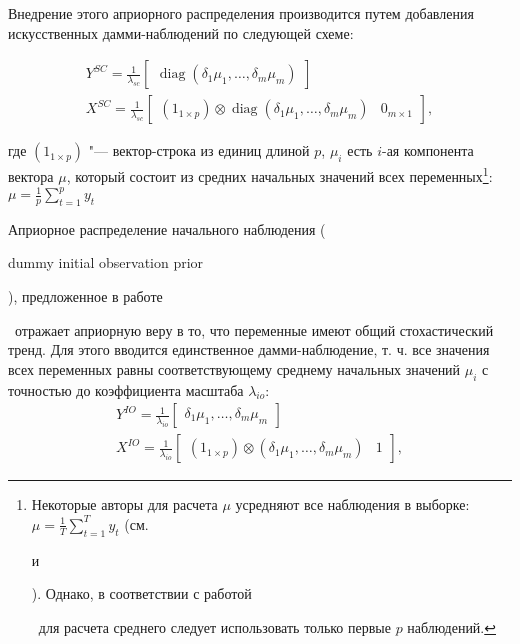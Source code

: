 \documentclass[11pt]{article} %
\DeclareMathOperator{\diag}{diag}
\newcommand{\post}{\overline}
\newcommand{\eng}[1]{\begin{otherlanguage}{english}#1\end{otherlanguage}}
\begin{document}
Внедрение этого априорного распределения производится путем добавления искусственных дамми-наблюдений по следующей схеме:


\begin{gather}
Y^{SC}=\frac{1}{\lambda_{sc}}\begin{bmatrix}\diag(\delta_1\mu_1,\ldots,\delta_m\mu_m)\end{bmatrix}\\
X^{SC}=\frac{1}{\lambda_{sc}}\begin{bmatrix}(1_{1\times p})\otimes \diag(\delta_1\mu_1,\ldots,\delta_m\mu_m) &0_{m\times 1}\end{bmatrix},
\end{gather}

где $(1_{1\times p})$ "--- вектор-строка из единиц длиной $p$, $\mu_i$ есть $i$-ая компонента вектора $\mu$, который состоит из средних начальных значений всех переменных\footnote{Некоторые авторы для  расчета $\mu$ усредняют все наблюдения в выборке: $\mu=\frac{1}{T}\sum_{t=1}^T y_t$ (см. \eng{\cite{banbura_al_2010}} и \eng{\cite{carriero_al_2015}}). Однако, в соответствии с работой \eng{\cite{sims_zha_1998}}~для расчета среднего следует использовать только первые $p$ наблюдений.}: $\mu=\frac{1}{p}\sum_{t=1}^p y_t$

Априорное распределение начального наблюдения (\eng{dummy initial observation prior}), предложенное в работе \eng{\cite{sims_1993}}~отражает априорную веру в то, что переменные имеют общий стохастический тренд. Для этого вводится единственное дамми-наблюдение, т. ч. все значения всех переменных равны соответствующему среднему начальных значений $\mu_i$ с точностью до коэффициента масштаба $\lambda_{io}$:
\begin{gather}
Y^{IO}=\frac{1}{\lambda_{io}}\begin{bmatrix}
\delta_1\mu_1,\ldots,\delta_m\mu_m
\end{bmatrix}\\
X^{IO}=\frac{1}{\lambda_{io}}\begin{bmatrix}
(1_{1\times p})\otimes (\delta_1\mu_1,\ldots,\delta_m\mu_m) &1
\end{bmatrix},
\end{gather}
\end{document}
